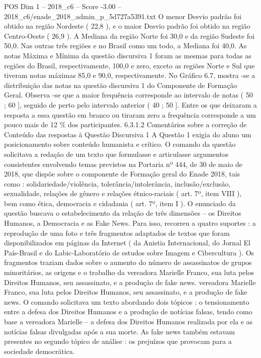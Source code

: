 \begin{textsample}{POS Dim 1 – 2018\_c6 – Score -3.00 – 2018\_c6/enade\_2018\_admin\_p\_5d727a5391.txt}
O menor Desvio padrão foi obtido na região Nordeste ( 22,8 ), e o maior Desvio padrão foi obtido na região Centro-Oeste ( 26,9 ).
A Mediana da região Norte foi 30,0 e da região Sudeste foi 50,0.
Nas outras três regiões e no Brasil como um todo, a Mediana foi 40,0.
As notas Máxima e Mínima da questão discursiva 1 foram as mesmas para todas as regiões do Brasil, respectivamente, 100,0 e zero, exceto as regiões Norte e Sul que tiveram notas máximas 85,0 e 90,0, respectivamente.
No Gráfico 6.7, mostra -se a distribuição das notas na questão discursiva 1 do Componente de Formação Geral.
Observa -se que a maior frequência corresponde ao intervalo de notas ( 50 ; 60 ], seguido de perto pelo intervalo anterior ( 40 ; 50 ].
Entre os que deixaram a resposta a essa questão em branco ou tiraram zero a frequência corresponde a um pouco mais de 12 \% dos participantes. 6.3.1.2 Comentários sobre a correção de Conteúdo das respostas à Questão Discursiva 1 A Questão 1 exigia do aluno um posicionamento sobre conteúdo humanista e crítico.
O comando da questão solicitava a redação de um texto que formulasse e articulasse argumentos consistentes envolvendo temas previstos na Portaria nº 444, de 30 de maio de 2018, que dispõe sobre o componente de Formação geral do Enade 2018, tais como : solidariedade/violência, tolerância/intolerância, inclusão/exclusão, sexualidade, relações de gênero e relações étnico-raciais ( art. 7º, item VIII ), bem como ética, democracia e cidadania ( art. 7º, item I ).
O enunciado da questão buscava o estabelecimento da relação de três dimensões – os Direitos Humanos, a Democracia e as Fake News.
Para isso, recorreu a quatro suportes : a reprodução de uma foto e três fragmentos adaptados de textos que foram disponibilizados em páginas da Internet ( da Anistia Internacional, do Jornal El País-Brasil e do Labic-Laboratório de estudos sobre Imagem e Cibercultura ).
Os fragmentos traziam dados sobre o aumento do número de assassinatos de grupos minoritários, as origens e o trabalho da vereadora Marielle Franco, sua luta pelos Direitos Humanos, seu assassinato, e a produção de fake news. vereadora Marielle Franco, sua luta pelos Direitos Humanos, seu assassinato, e a produção de fake news.
O comando solicitava um texto abordando dois tópicos : o tensionamento entre a defesa dos Direitos Humanos e a produção de notícias falsas, tendo como base a vereadora Marielle – a defesa dos Direitos Humanos realizada por ela e as notícias falsas divulgadas após a sua morte.
As fake news também estavam presentes no segundo tópico de análise : os prejuízos que provocam para a sociedade democrática.

\end{textsample}
